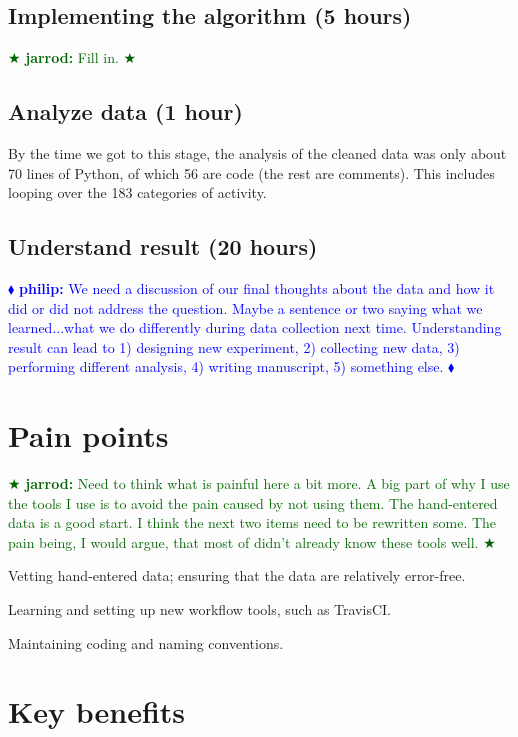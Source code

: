 \documentclass[]{article}
\newcommand{\philip}[1] { \textcolor{blue} {
\ensuremath{\blacklozenge} {\bf philip:}  {#1}
\ensuremath{\blacklozenge} } }
\newcommand{\jarrod}[1] { \textcolor{darkgreen} {
\ensuremath{\bigstar} {\bf jarrod:}  {#1}
\ensuremath{\bigstar} } }
\begin{document}
\subsection{Implementing the algorithm (5 hours)}

\jarrod{Fill in.}
  
\subsection{Analyze data (1 hour)}

By the time we got to this stage, the analysis of the cleaned data was only
about 70 lines of Python, of which 56 are code (the rest are comments).
This includes looping over the 183 categories of activity.

\subsection{Understand result (20 hours)}

\philip{We need a discussion of our final thoughts about the data
and how it did or did not address the question.  Maybe a sentence
or two saying what we learned...what we do differently during
data collection next time.
Understanding result can lead to
1) designing new experiment,
2) collecting new data,
3) performing different analysis,
4) writing manuscript,
5) something else. 
}

\section{Pain points}\label{pain-points}


\jarrod{Need to think what is painful here a bit more. A big part of 
why I use the tools I use is to avoid the pain caused by not using
them.  The hand-entered data is a good start.  I think the next
two items need to be rewritten some.  The pain being, I would argue,
that most of didn't already know these tools well.} 

Vetting hand-entered data; ensuring that the data are relatively
error-free.

Learning and setting up new workflow tools, such as TravisCI.

Maintaining coding and naming conventions.

\section{Key benefits}\label{key-benefits}
\end{document}
